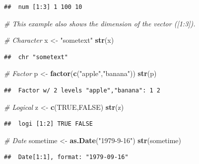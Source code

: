 \documentclass[]{book}
\newenvironment{Shaded}{\begin{snugshade}}{\end{snugshade}}
\newcommand{\CommentTok}[1]{\textcolor[rgb]{0.56,0.35,0.01}{\textit{#1}}}
\newcommand{\KeywordTok}[1]{\textcolor[rgb]{0.13,0.29,0.53}{\textbf{#1}}}
\newcommand{\NormalTok}[1]{#1}
\newcommand{\OtherTok}[1]{\textcolor[rgb]{0.56,0.35,0.01}{#1}}
\newcommand{\StringTok}[1]{\textcolor[rgb]{0.31,0.60,0.02}{#1}}
\begin{document}
\begin{verbatim}
##  num [1:3] 1 100 10
\end{verbatim}

\begin{Shaded}
\begin{Highlighting}[]
\CommentTok{# This example also shows the dimension of the vector ([1:3]).}

\CommentTok{# Character}
\NormalTok{x <-}\StringTok{ "sometext"}
\KeywordTok{str}\NormalTok{(x)}
\end{Highlighting}
\end{Shaded}

\begin{verbatim}
##  chr "sometext"
\end{verbatim}

\begin{Shaded}
\begin{Highlighting}[]
\CommentTok{# Factor}
\NormalTok{p <-}\StringTok{ }\KeywordTok{factor}\NormalTok{(}\KeywordTok{c}\NormalTok{(}\StringTok{"apple"}\NormalTok{,}\StringTok{"banana"}\NormalTok{))}
\KeywordTok{str}\NormalTok{(p)}
\end{Highlighting}
\end{Shaded}

\begin{verbatim}
##  Factor w/ 2 levels "apple","banana": 1 2
\end{verbatim}

\begin{Shaded}
\begin{Highlighting}[]
\CommentTok{# Logical}
\NormalTok{z <-}\StringTok{ }\KeywordTok{c}\NormalTok{(}\OtherTok{TRUE}\NormalTok{,}\OtherTok{FALSE}\NormalTok{)}
\KeywordTok{str}\NormalTok{(z)}
\end{Highlighting}
\end{Shaded}

\begin{verbatim}
##  logi [1:2] TRUE FALSE
\end{verbatim}

\begin{Shaded}
\begin{Highlighting}[]
\CommentTok{# Date}
\NormalTok{sometime <-}\StringTok{ }\KeywordTok{as.Date}\NormalTok{(}\StringTok{"1979-9-16"}\NormalTok{)}
\KeywordTok{str}\NormalTok{(sometime)}
\end{Highlighting}
\end{Shaded}

\begin{verbatim}
##  Date[1:1], format: "1979-09-16"
\end{verbatim}
\end{document}
